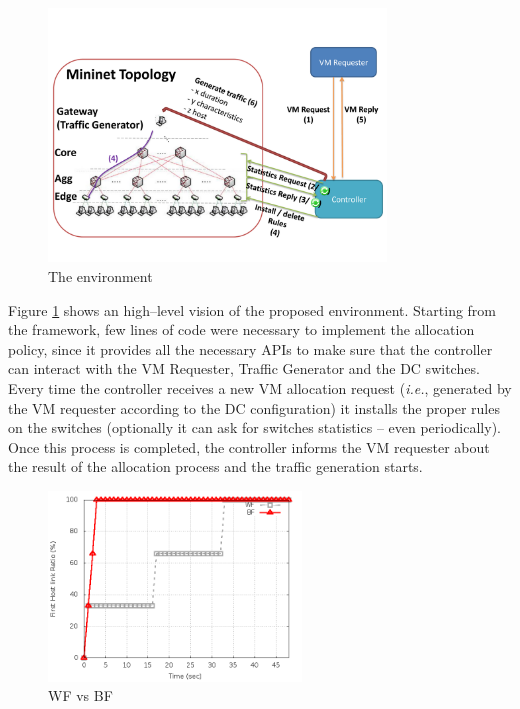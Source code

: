 \documentclass[12pt,english,oneside]{book}
\begin{document}
\begin{figure}[h!tbp]
        \centering
        \includegraphics[width=0.8\textwidth]{figures/figure1.pdf}
        \caption{The environment}
        \label{fig:use_case}
\end{figure}


Figure \ref{fig:use_case} shows an high--level vision of the proposed environment. Starting from the framework, few lines of code were necessary to implement the allocation policy, since it provides all the necessary APIs to make sure that the controller can interact with the VM Requester, Traffic Generator and the DC switches.
Every time the controller receives a new VM allocation request (\textit{i.e.}, generated by the VM requester according to the DC configuration) it installs the proper rules on the switches (optionally it can ask for switches statistics -- even periodically). Once this process is completed, the controller informs the VM requester about the result of the allocation process and the traffic generation starts.


\begin{figure}[h!tbp]
        \centering
        \includegraphics[width=0.6\textwidth]{figures/use_case.png}
        \caption{WF vs BF}
        \label{fig:wf_bf}
\end{figure}
\end{document}

